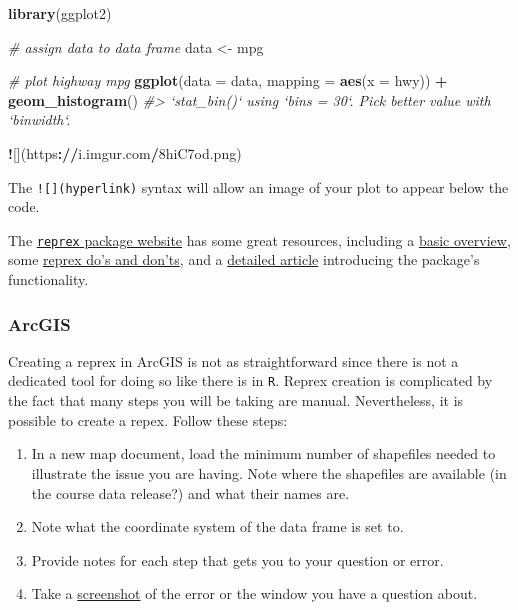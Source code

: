 \documentclass[]{book}
\newenvironment{Shaded}{\begin{snugshade}}{\end{snugshade}}
\newcommand{\KeywordTok}[1]{\textcolor[rgb]{0.13,0.29,0.53}{\textbf{#1}}}
\newcommand{\DataTypeTok}[1]{\textcolor[rgb]{0.13,0.29,0.53}{#1}}
\newcommand{\StringTok}[1]{\textcolor[rgb]{0.31,0.60,0.02}{#1}}
\newcommand{\CommentTok}[1]{\textcolor[rgb]{0.56,0.35,0.01}{\textit{#1}}}
\newcommand{\OperatorTok}[1]{\textcolor[rgb]{0.81,0.36,0.00}{\textbf{#1}}}
\newcommand{\ErrorTok}[1]{\textcolor[rgb]{0.64,0.00,0.00}{\textbf{#1}}}
\newcommand{\NormalTok}[1]{#1}
\providecommand{\tightlist}{%
  \setlength{\itemsep}{0pt}\setlength{\parskip}{0pt}}
\theoremstyle{definition}
\theoremstyle{definition}
\theoremstyle{definition}
\theoremstyle{remark}
\begin{document}
\begin{Shaded}
\begin{Highlighting}[]
\KeywordTok{library}\NormalTok{(ggplot2)}

\CommentTok{# assign data to data frame}
\NormalTok{data <-}\StringTok{ }\NormalTok{mpg}

\CommentTok{# plot highway mpg}
\KeywordTok{ggplot}\NormalTok{(}\DataTypeTok{data =}\NormalTok{ data, }\DataTypeTok{mapping =} \KeywordTok{aes}\NormalTok{(}\DataTypeTok{x =}\NormalTok{ hwy)) }\OperatorTok{+}\StringTok{ }
\StringTok{  }\KeywordTok{geom_histogram}\NormalTok{()}
\CommentTok{#> `stat_bin()` using `bins = 30`. Pick better value with `binwidth`.}

\OperatorTok{!}\NormalTok{[](https}\OperatorTok{:}\ErrorTok{//}\NormalTok{i.imgur.com}\OperatorTok{/}\NormalTok{8hiC7od.png)}
\end{Highlighting}
\end{Shaded}

The \texttt{!{[}{]}(hyperlink)} syntax will allow an image of your plot
to appear below the code.

The \href{http://reprex.tidyverse.org}{\texttt{reprex} package website}
has some great resources, including a
\href{http://reprex.tidyverse.org}{basic overview}, some
\href{http://reprex.tidyverse.org/articles/reprex-dos-and-donts.html}{reprex
do's and don'ts}, and a
\href{http://reprex.tidyverse.org/articles/articles/magic-reprex.html}{detailed
article} introducing the package's functionality.

\subsubsection{ArcGIS}\label{arcgis}

Creating a reprex in ArcGIS is not as straightforward since there is not
a dedicated tool for doing so like there is in \texttt{R}. Reprex
creation is complicated by the fact that many steps you will be taking
are manual. Nevertheless, it is possible to create a repex. Follow these
steps:

\begin{enumerate}
\def\labelenumi{\arabic{enumi}.}
\tightlist
\item
  In a new map document, load the minimum number of shapefiles needed to
  illustrate the issue you are having. Note where the shapefiles are
  available (in the course data release?) and what their names are.
\item
  Note what the coordinate system of the data frame is set to.
\item
  Provide notes for each step that gets you to your question or error.
\item
  Take a \href{https://www.take-a-screenshot.org}{screenshot} of the
  error or the window you have a question about.
\end{enumerate}
\end{document}
